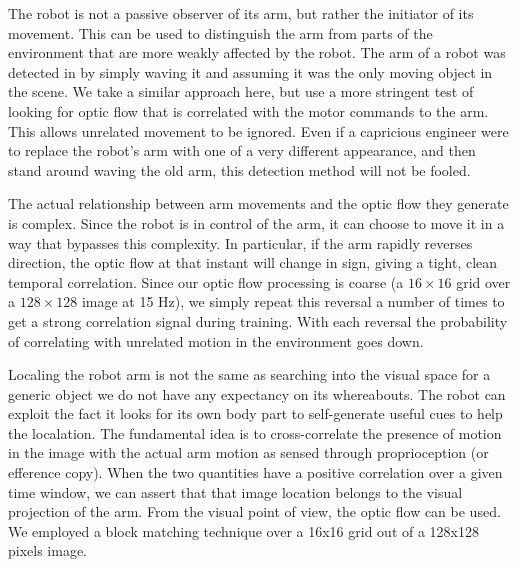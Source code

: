 The robot is not a passive observer of its arm, but rather the
initiator of its movement.  This can be used to distinguish the arm
from parts of the environment that are more weakly affected by the
robot.  The arm of a robot was detected in \cite{Marjanovic-96-SAB} by
simply waving it and assuming it was the only moving object in the
scene.  We take a similar approach here, but use a more
stringent test of looking for optic flow that is correlated with
the motor commands to the arm.  This allows unrelated movement
to be ignored.  Even if a capricious engineer were to 
replace the robot's arm with one of a very different appearance,
and then stand around waving the old arm, this detection method
will not be fooled.  

The actual relationship between arm movements and the optic flow they
generate is complex.  Since the robot is in control of the arm, it can
choose to move it in a way that bypasses this complexity.  In
particular, if the arm rapidly reverses direction, the optic flow at
that instant will change in sign, giving a tight, clean temporal
correlation.  Since our optic flow processing is coarse (a $16\times
16$ grid over a $128\times 128$ image at 15 Hz), we simply repeat this
reversal a number of times to get a strong correlation signal during
training.  With each reversal the probability of correlating with
unrelated motion in the environment goes down.  

\ifverbose
Local\iz{}ing the robot arm is not the same as searching into the visual
space for a generic object we do not have any expectancy on its
whereabouts. The robot can exploit the fact it looks for its own body
part to self-generate useful cues to help the local\iz{}ation. The
fundamental idea is to cross-correlate the presence of motion in the
image with the actual arm motion as sensed through proprioception (or
efference copy). When the two quantities have a positive correlation
over a given time window, we can assert that that image location
belongs to the visual projection of the arm. From the visual point of
view, the optic flow can be used. We employed a block matching
technique over a 16x16 grid out of a 128x128 pixels image.
\fi


